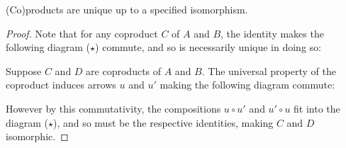 \documentclass[12pt,twoside]{reedthesis}
\begin{document}
\begin{lemma}
	(Co)products are unique up to a specified isomorphism.
\end{lemma}
\begin{proof}
  Note that for any coproduct $C$ of $A$ and $B$, the identity makes the
  following diagram ($⋆$) commute, and so is necessarily unique in doing so:
  \begin{center}
  \end{center}
	Suppose $C$ and $D$ are coproducts of $A$ and $B$. The universal
  property of the coproduct induces arrows $u$ and $u'$ making the following
  diagram commute:
  \begin{center}
  \end{center}
  However by this commutativity, the compositions $u∘u'$ and $u'∘u$ fit into the
  diagram ($⋆$), and so must be the respective identities, making $C$ and $D$
  isomorphic.
\end{proof}
\end{document}
